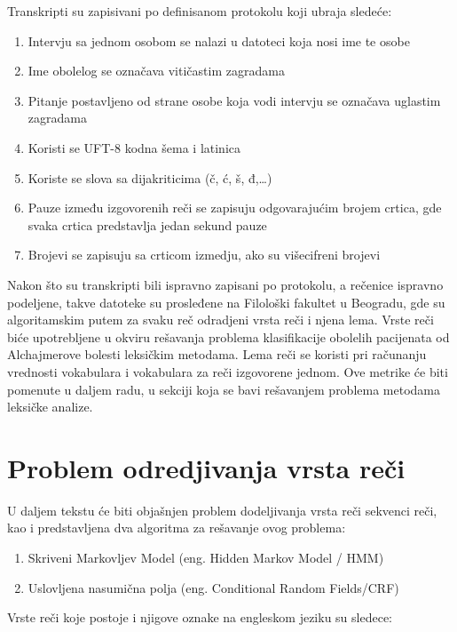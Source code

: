 \documentclass[12pt,oneside]{memoir}
\begin{document}
Transkripti su zapisivani po definisanom protokolu koji ubraja sledeće:

\begin{enumerate}
\item Intervju sa jednom osobom se nalazi u datoteci koja nosi ime te osobe
\item Ime obolelog se označava vitičastim zagradama 
\item Pitanje postavljeno od strane osobe koja vodi intervju se označava uglastim zagradama
\item Koristi se UFT-8 kodna šema i latinica
\item Koriste se slova sa dijakriticima (č, ć, š, đ,…)
\item Pauze između izgovorenih reči se zapisuju odgovarajućim brojem crtica,  gde svaka crtica predstavlja jedan sekund pauze
\item Brojevi se zapisuju sa crticom izmedju,  ako su višecifreni brojevi
\end{enumerate}

Nakon što su transkripti bili ispravno zapisani po protokolu,  a rečenice ispravno podeljene,  takve datoteke su prosleđene na Filološki fakultet u Beogradu,  gde su algoritamskim putem za svaku reč odradjeni vrsta reči i njena lema.  Vrste reči biće upotrebljene u okviru rešavanja problema klasifikacije obolelih pacijenata od Alchajmerove bolesti leksičkim metodama.  Lema reči se koristi pri računanju vrednosti vokabulara i vokabulara za reči izgovorene jednom.  Ove metrike će biti pomenute u daljem radu, u sekciji koja se bavi rešavanjem problema metodama leksičke analize. 

\section{Problem odredjivanja vrsta reči}

U daljem tekstu će biti objašnjen problem dodeljivanja vrsta reči sekvenci reči,  kao i predstavljena dva algoritma za rešavanje ovog problema:
\begin{enumerate}
\item Skriveni Markovljev Model (eng. Hidden Markov Model / HMM)
\item Uslovljena nasumična polja (eng. Conditional Random Fields/CRF)
\end{enumerate}
\break
Vrste reči koje postoje i njigove oznake na engleskom jeziku su sledece:
\end{document}
